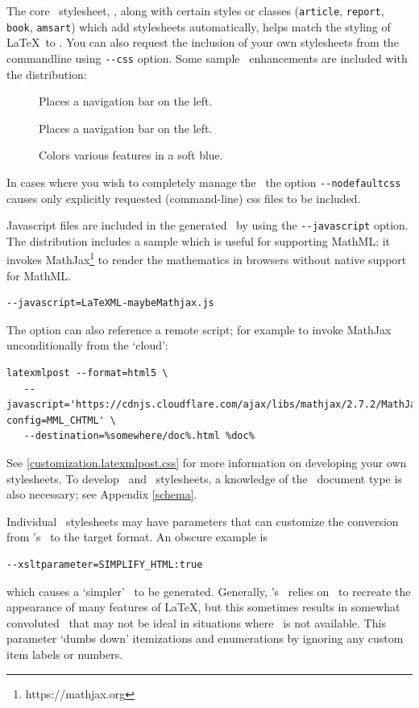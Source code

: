 \documentclass{book}
\newcommand{\shellcode}{\lstinline[style=shell]}
\begin{document}
The core \CSS\ stylesheet, , along with
certain styles or classes (\texttt{article}, \texttt{report}, \texttt{book},
\texttt{amsart}) which add stylesheets automatically,
helps match the styling of \LaTeX\ to \HTML.
You can also request the inclusion of your own stylesheets from the commandline using
\shellcode{--css} option.  Some sample \CSS\ enhancements are included with the distribution:
\begin{description}
\item[] Places a navigation bar on the left.
\item[] Places a navigation bar on the left.
\item[] Colors various features in a soft blue.
\end{description}
In cases where you wish to completely manage the \CSS\,
the option \shellcode{--nodefaultcss} causes only explicitly requested (command-line)
css files to be included.

Javascript files are included in the generated \HTML\ by using the \shellcode{--javascript} option.
The distribution includes a sample  which is useful
for supporting MathML: it invokes MathJax\footnote{https://mathjax.org}
to render the mathematics in browsers without native support for MathML.
\begin{lstlisting}[style=shell]
--javascript=LaTeXML-maybeMathjax.js
\end{lstlisting}
The option can also reference a remote script; for example to invoke MathJax unconditionally
from the `cloud':
\begin{lstlisting}[style=shell]
latexmlpost --format=html5 \
   --javascript='https://cdnjs.cloudflare.com/ajax/libs/mathjax/2.7.2/MathJax.js?config=MML_CHTML' \
   --destination=%somewhere/doc%.html %doc%
\end{lstlisting}

See \ref{customization.latexmlpost.css} for more information on developing your own stylesheets.
To develop \CSS\ and \XSLT\ stylesheets, 
a knowledge of the \LaTeXML\ document type is also necessary; see  Appendix \ref{schema}.

Individual \XSLT\ stylesheets may have parameters that can customize the
conversion from \LaTeXML's \XML\ to the target format.  An obscure example is
\begin{lstlisting}[style=shell]
--xsltparameter=SIMPLIFY_HTML:true
\end{lstlisting}
which causes a `simpler' \HTML\ to be generated.
Generally, \LaTeXML's \HTML\ relies on \CSS\ to recreate the appearance
of many features of \LaTeX, but this sometimes results in somewhat convoluted
\HTML\ that may not be ideal in situations where \CSS\ is not available.
This parameter `dumbs down' itemizations and enumerations by
ignoring any custom item labels or numbers.
\end{document}
